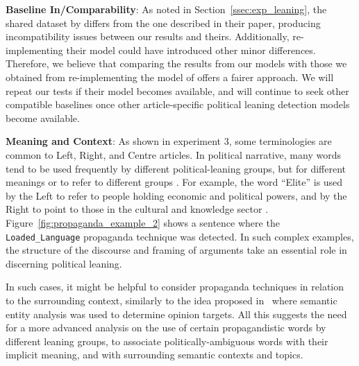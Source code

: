 \noindent\textbf{Baseline In/Comparability}: %
As noted in Section~\ref{ssec:exp_leaning}, the shared dataset by \citet{baly2020we} differs from the one described in their paper, producing incompatibility issues between our results and theirs. %
Additionally, re-implementing their model could have introduced other minor differences. Therefore, we believe that comparing the results from our models with those we obtained from re-implementing the model of \citet{baly2020we} offers a fairer approach. We will repeat our tests if their model becomes available, and will continue to seek other compatible baselines once other article-specific political leaning detection models become available.  

\noindent\textbf{Meaning and Context}: As shown in experiment 3, some terminologies are common to Left, Right, and Centre articles. In political narrative, many words tend to be used frequently by different political-leaning groups, but for different meanings or to refer to different groups \cite{seargeant2020art}. For example, the word ``Elite'' is used by the Left to refer to people holding economic and political powers, and by the Right to point to those in the cultural and knowledge sector \cite{seargeant2020art}.  
Figure~\ref{fig:propaganda_example_2} shows a sentence where the \texttt{Loaded\_Language} propaganda technique was detected. In such complex examples, the structure of the discourse and framing of arguments take an essential role in discerning political leaning. 

In such cases, it might be helpful to consider propaganda techniques in relation to the surrounding context, similarly to the idea proposed in~\citet{chen2017opinion} where semantic entity analysis was used to determine opinion targets. 
All this suggests the need for a more advanced analysis on the use of certain propagandistic words by different leaning groups, to associate politically-ambiguous words with their implicit meaning, and with surrounding semantic contexts and topics.



